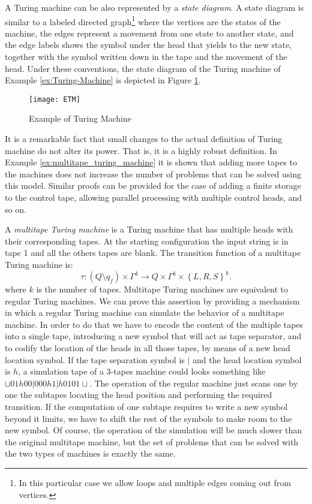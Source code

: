 A Turing machine can be also represented by a \emph{state diagram}. A state diagram is similar to a labeled directed graph\footnote{In this particular case we allow loops and multiple edges coming out from vertices.} where the vertices are the states of the machine, the edges represent a movement from one state to another state, and the edge labels shows the symbol under the head that yields to the new state, together with the symbol written down in the tape and the movement of the head. Under these conventions, the state diagram of the Turing machine of Example \ref{ex:Turing-Machine} is depicted in Figure \ref{fig:Example-Turing-Machine}.

\begin{figure}[h]
\centering\texttt{[image: ETM]}
\caption{\label{fig:Example-Turing-Machine}Example of Turing Machine}
\end{figure}

It is a remarkable fact that small changes to the actual definition of Turing machine do not alter its power. That is, it is a highly robust definition. In Example \ref{ex:multitape_turing_machine} it is shown that adding more tapes to the machines does not increase the number of problems that can be solved using this model. Similar proofs can be provided for the case of adding a finite storage to the control tape, allowing parallel processing with multiple control heads, and so on.

\begin{example}
\label{ex:multitape_turing_machine}
A \emph{multitape Turing machine} is a Turing machine that has multiple heads with their corresponding tapes. At the starting configuration the input string is in tape 1 and all the others tapes are blank. The transition function of a multitape Turing machine is:
\[
\tau:\left(Q \setminus q_{f} \right) \times \Gamma^k \rightarrow  Q \times \Gamma^k \times \left\{L,R,S\right\}^k.
\]
where $k$ is the number of tapes. Multitape Turing machines are equivalent to regular Turing machines. We can prove this assertion by providing a mechanism in which a regular Turing machine can simulate the behavior of a multitape machine. In order to do that we have to encode the content of the multiple tapes into a single tape, introducing a new symbol that will act as tape separator, and to codify the location of the heads in all those tapes, by means of a new head location symbol. If the tape separation symbol is $|$ and the head location symbol is $h$, a simulation tape of a 3-tapes machine could looks something like $\sqcup01h00|000h1|h0101\sqcup$. The operation of the regular machine just scans one by one the subtapes locating the head position and performing the required transition. If the computation of one subtape requires to write a new symbol beyond it limits, we have to shift the rest of the symbols to make room to the new symbol. Of course, the operation of the simulation will be much slower than the original multitape machine, but the set of problems that can be solved with the two types of machines is exactly the same.
\end{example}

